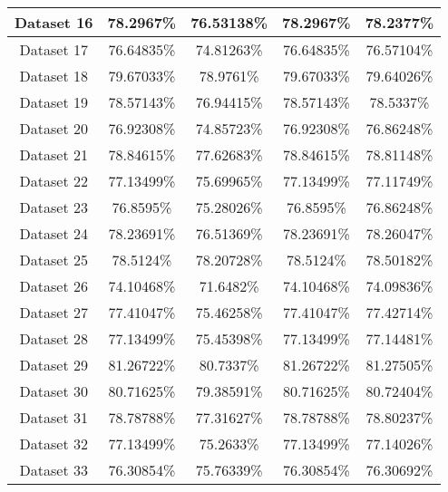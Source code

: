 \begin{table}
\begin{tabular}{ |c||c|c|c|c| }
    \hline
    Dataset 16 & 78.2967\% & 76.53138\% & 78.2967\% & 78.2377\%\\
    \hline
    Dataset 17 & 76.64835\% & 74.81263\% & 76.64835\% & 76.57104\%\\
    \hline
    Dataset 18 & 79.67033\% & 78.9761\% & 79.67033\% & 79.64026\%\\
    \hline
    Dataset 19 & 78.57143\% & 76.94415\% & 78.57143\% & 78.5337\%\\
    \hline
    Dataset 20 & 76.92308\% & 74.85723\% & 76.92308\% & 76.86248\%\\
    \hline
    Dataset 21 & 78.84615\% & 77.62683\% & 78.84615\% & 78.81148\%\\
    \hline
    Dataset 22 & 77.13499\% & 75.69965\% & 77.13499\% & 77.11749\%\\
    \hline
    Dataset 23 & 76.8595\% & 75.28026\% & 76.8595\% & 76.86248\%\\
    \hline
    Dataset 24 & 78.23691\% & 76.51369\% & 78.23691\% & 78.26047\%\\
    \hline
    Dataset 25 & 78.5124\% & 78.20728\% & 78.5124\% & 78.50182\%\\
    \hline
    Dataset 26 & 74.10468\% & 71.6482\% & 74.10468\% & 74.09836\%\\
    \hline
    Dataset 27 & 77.41047\% & 75.46258\% & 77.41047\% & 77.42714\%\\
    \hline
    Dataset 28 & 77.13499\% & 75.45398\% & 77.13499\% & 77.14481\%\\
    \hline
    Dataset 29 & 81.26722\% & 80.7337\% & 81.26722\% & 81.27505\%\\
    \hline
    Dataset 30 & 80.71625\% & 79.38591\% & 80.71625\% & 80.72404\%\\
    \hline
    Dataset 31 & 78.78788\% & 77.31627\% & 78.78788\% & 78.80237\%\\
    \hline
    Dataset 32 & 77.13499\% & 75.2633\% & 77.13499\% & 77.14026\%\\
    \hline
    Dataset 33 & 76.30854\% & 75.76339\% & 76.30854\% & 76.30692\%\\
    \hline
\end{tabular}
\end{table}

\newpage

